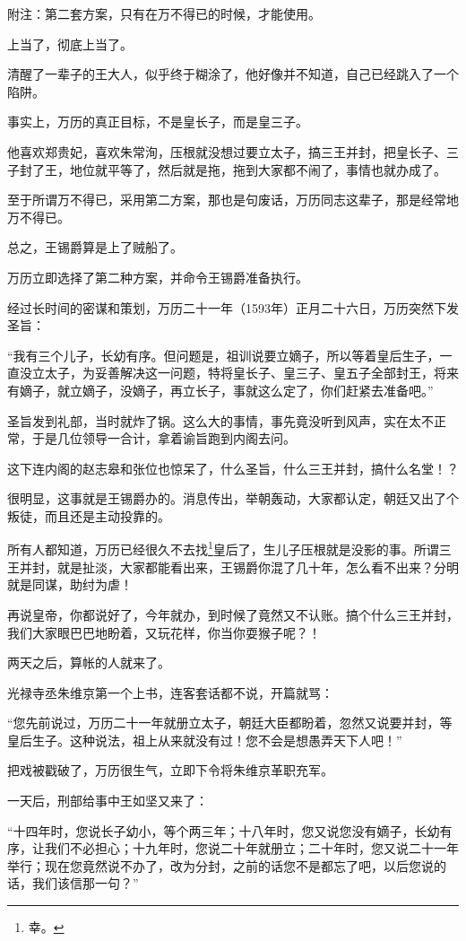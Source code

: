\begin{multicols}{\theparacolNo}
附注：第二套方案，只有在万不得已的时候，才能使用。

上当了，彻底上当了。

清醒了一辈子的王大人，似乎终于糊涂了，他好像并不知道，自己已经跳入了一个陷阱。

事实上，万历的真正目标，不是皇长子，而是皇三子。

他喜欢郑贵妃，喜欢朱常洵，压根就没想过要立太子，搞三王并封，把皇长子、三子封了王，地位就平等了，然后就是拖，拖到大家都不闹了，事情也就办成了。

至于所谓万不得已，采用第二方案，那也是句废话，万历同志这辈子，那是经常地万不得已。

总之，王锡爵算是上了贼船了。

万历立即选择了第二种方案，并命令王锡爵准备执行。

经过长时间的密谋和策划，万历二十一年（1593年）正月二十六日，万历突然下发圣旨：

“我有三个儿子，长幼有序。但问题是，祖训说要立嫡子，所以等着皇后生子，一直没立太子，为妥善解决这一问题，特将皇长子、皇三子、皇五子全部封王，将来有嫡子，就立嫡子，没嫡子，再立长子，事就这么定了，你们赶紧去准备吧。”

圣旨发到礼部，当时就炸了锅。这么大的事情，事先竟没听到风声，实在太不正常，于是几位领导一合计，拿着谕旨跑到内阁去问。

这下连内阁的赵志皋和张位也惊呆了，什么圣旨，什么三王并封，搞什么名堂！？

很明显，这事就是王锡爵办的。消息传出，举朝轰动，大家都认定，朝廷又出了个叛徒，而且还是主动投靠的。

所有人都知道，万历已经很久不去找\footnote{幸。}皇后了，生儿子压根就是没影的事。所谓三王并封，就是扯淡，大家都能看出来，王锡爵你混了几十年，怎么看不出来？分明就是同谋，助纣为虐！

再说皇帝，你都说好了，今年就办，到时候了竟然又不认账。搞个什么三王并封，我们大家眼巴巴地盼着，又玩花样，你当你耍猴子呢？！

两天之后，算帐的人就来了。

光禄寺丞朱维京第一个上书，连客套话都不说，开篇就骂：

“您先前说过，万历二十一年就册立太子，朝廷大臣都盼着，忽然又说要并封，等皇后生子。这种说法，祖上从来就没有过！您不会是想愚弄天下人吧！”

把戏被戳破了，万历很生气，立即下令将朱维京革职充军。

一天后，刑部给事中王如坚又来了：

“十四年时，您说长子幼小，等个两三年；十八年时，您又说您没有嫡子，长幼有序，让我们不必担心；十九年时，您说二十年就册立；二十年时，您又说二十一年举行；现在您竟然说不办了，改为分封，之前的话您不是都忘了吧，以后您说的话，我们该信那一句？”


\end{multicols}
